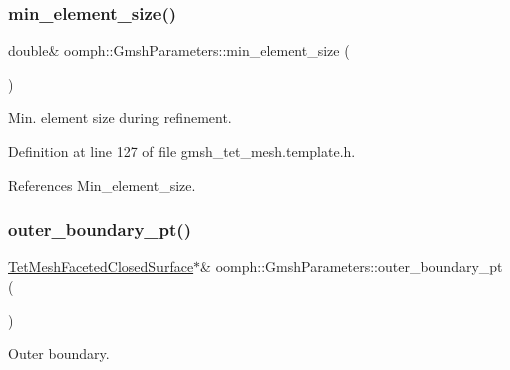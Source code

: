 \mbox{\label{classoomph_1_1GmshParameters_a4afd4f1f72b1f45b3ca51b186737f264}} 
\subsubsection{\texorpdfstring{min\+\_\+element\+\_\+size()}{min\_element\_size()}}
{\footnotesize\ttfamily double\& oomph\+::\+Gmsh\+Parameters\+::min\+\_\+element\+\_\+size (\begin{DoxyParamCaption}{ }\end{DoxyParamCaption})\hspace{0.3cm}{\ttfamily [inline]}}



Min. element size during refinement. 



Definition at line 127 of file gmsh\+\_\+tet\+\_\+mesh.\+template.\+h.



References Min\+\_\+element\+\_\+size.

\mbox{\label{classoomph_1_1GmshParameters_abdd71edac9d5fd08a6a9c978d2673a2e}} 
\subsubsection{\texorpdfstring{outer\+\_\+boundary\+\_\+pt()}{outer\_boundary\_pt()}}
{\footnotesize\ttfamily \hyperlink{classoomph_1_1TetMeshFacetedClosedSurface}{Tet\+Mesh\+Faceted\+Closed\+Surface}$\ast$\& oomph\+::\+Gmsh\+Parameters\+::outer\+\_\+boundary\+\_\+pt (\begin{DoxyParamCaption}{ }\end{DoxyParamCaption})\hspace{0.3cm}{\ttfamily [inline]}}



Outer boundary. 




